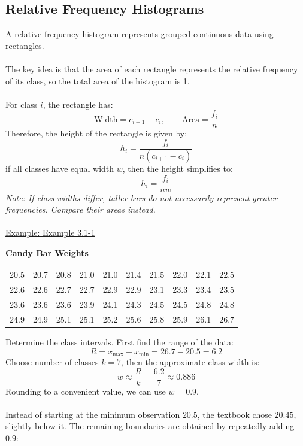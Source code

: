 ﻿\documentclass[12pt]{article}
\begin{document}
\subsection*{Relative Frequency Histograms}
A relative frequency histogram represents grouped continuous data using rectangles.\\\\
The key idea is that the area of each rectangle represents the relative frequency of its class, so the total area of the histogram is 1.\\\\
For class $i$, the rectangle has:
\[
\text{Width}=c_{i+1}-c_i,\qquad \text{Area}=\frac{f_i}{n}
\]
Therefore, the height of the rectangle is given by:
\[
\boxed{h_i=\frac{f_i}{n(c_{i+1}-c_i)}}
\]
if all classes have equal width $w$, then the height simplifies to:
\[
\boxed{h_i=\frac{f_i}{nw}}
\]
\textit{Note: If class widths differ, taller bars do not necessarily represent greater frequencies. Compare their areas instead.}\\\\
\underline{Example: Example 3.1-1}\\
\vspace{-2em}
\begin{center}
    \textbf{Candy Bar Weights}\\
\renewcommand{\arraystretch}{1.3}
\begin{tabular}{cccccccccc}
\hline
20.5 & 20.7 & 20.8 & 21.0 & 21.0 & 21.4 & 21.5 & 22.0 & 22.1 & 22.5 \\
22.6 & 22.6 & 22.7 & 22.7 & 22.9 & 22.9 & 23.1 & 23.3 & 23.4 & 23.5 \\
23.6 & 23.6 & 23.6 & 23.9 & 24.1 & 24.3 & 24.5 & 24.5 & 24.8 & 24.8 \\
24.9 & 24.9 & 25.1 & 25.1 & 25.2 & 25.6 & 25.8 & 25.9 & 26.1 & 26.7 \\
\hline
\end{tabular}
\end{center}
Determine the class intervals. First find the range of the data:
\[
R=x_{\max}-x_{\min}=26.7-20.5=6.2
\]
Choose number of classes $k=7$, then the approximate class width is:
\[
w\approx\frac{R}{k}=\frac{6.2}{7}\approx0.886
\]
Rounding to a convenient value, we can use $w=0.9$.\\\\
Instead of starting at the minimum observation \(20.5\), the textbook chose \(20.45\), slightly below it. The remaining boundaries are obtained by repeatedly adding \(0.9\):
\end{document}
